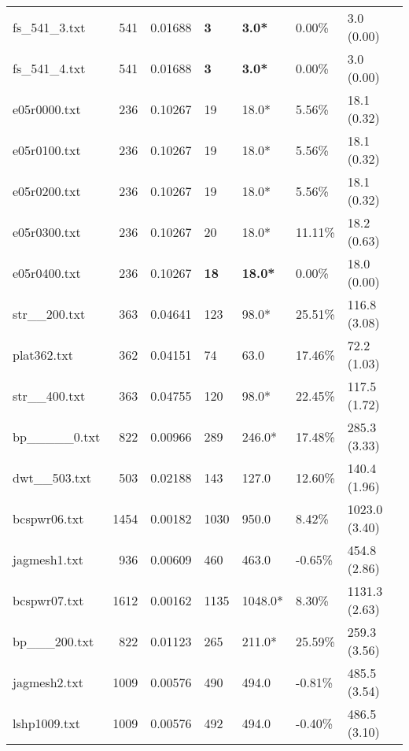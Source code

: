 \begin{table}[h]
\begin{tabular}{lrrllll}
 fs_541_3.txt       &     541 &     0.01688 & \textbf{3}   & \textbf{3.0*}   & 0.00\%   & 3.0 (0.00)     \\
 fs_541_4.txt       &     541 &     0.01688 & \textbf{3}   & \textbf{3.0*}   & 0.00\%   & 3.0 (0.00)     \\
 e05r0000.txt       &     236 &     0.10267 & 19           & 18.0*           & 5.56\%   & 18.1 (0.32)    \\
 e05r0100.txt       &     236 &     0.10267 & 19           & 18.0*           & 5.56\%   & 18.1 (0.32)    \\
 e05r0200.txt       &     236 &     0.10267 & 19           & 18.0*           & 5.56\%   & 18.1 (0.32)    \\
 e05r0300.txt       &     236 &     0.10267 & 20           & 18.0*           & 11.11\%  & 18.2 (0.63)    \\
 e05r0400.txt       &     236 &     0.10267 & \textbf{18}  & \textbf{18.0*}  & 0.00\%   & 18.0 (0.00)    \\
 str__200.txt       &     363 &     0.04641 & 123          & 98.0*           & 25.51\%  & 116.8 (3.08)   \\
 plat362.txt        &     362 &     0.04151 & 74           & 63.0            & 17.46\%  & 72.2 (1.03)    \\
 str__400.txt       &     363 &     0.04755 & 120          & 98.0*           & 22.45\%  & 117.5 (1.72)   \\
 bp_____0.txt       &     822 &     0.00966 & 289          & 246.0*          & 17.48\%  & 285.3 (3.33)   \\
 dwt__503.txt       &     503 &     0.02188 & 143          & 127.0           & 12.60\%  & 140.4 (1.96)   \\
 bcspwr06.txt       &    1454 &     0.00182 & 1030         & 950.0           & 8.42\%   & 1023.0 (3.40)  \\
 jagmesh1.txt       &     936 &     0.00609 & 460          & 463.0           & -0.65\%  & 454.8 (2.86)   \\
 bcspwr07.txt       &    1612 &     0.00162 & 1135         & 1048.0*         & 8.30\%   & 1131.3 (2.63)  \\
 bp___200.txt       &     822 &     0.01123 & 265          & 211.0*          & 25.59\%  & 259.3 (3.56)   \\
 jagmesh2.txt       &    1009 &     0.00576 & 490          & 494.0           & -0.81\%  & 485.5 (3.54)   \\
 lshp1009.txt       &    1009 &     0.00576 & 492          & 494.0           & -0.40\%  & 486.5 (3.10)   \\

\end{tabular}
\end{table}
